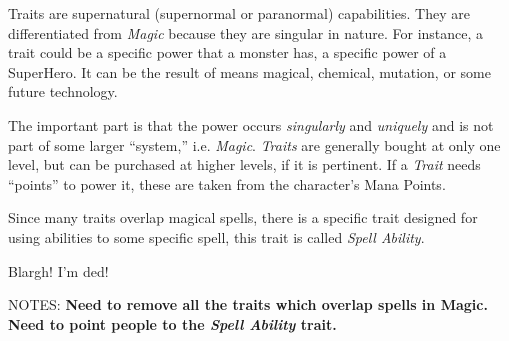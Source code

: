 Traits are supernatural (supernormal or paranormal) capabilities. They
are differentiated from \emph{Magic} because they are singular in
nature. For instance, a trait could be a specific power that a monster
has, a specific power of a SuperHero. It can be the result of means
magical, chemical, mutation, or some future technology.

The important part is that the power occurs \emph{singularly} and
\emph{uniquely} and is not part of some larger ``system,''
i.e. \emph{Magic}. \emph{Traits} are generally bought at only one
level, but can be purchased at higher levels, if it is pertinent. If a
\emph{Trait} needs ``points'' to power it, these are taken from the
character's Mana Points.

Since many traits overlap magical spells, there is a specific trait
designed for using abilities to some specific spell, this trait is
called \emph{Spell Ability}.

Blargh! I'm ded!

NOTES: {\small \textbf{Need to remove all the traits which overlap
spells in Magic. Need to point people to the \emph{Spell Ability}
trait.}}